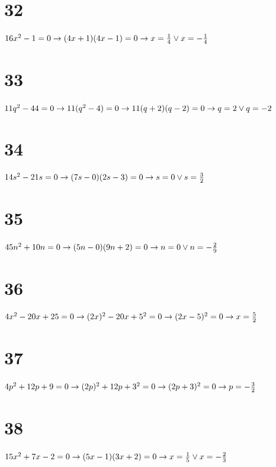 \documentclass{article}
\theoremstyle{definition}
\begin{document}
\section*{32}
$16x^2-1=0\newline\rightarrow (4x+1)(4x-1)=0\newline\rightarrow x=\frac{1}{4}\vee x=-\frac{1}{4}$

\section*{33}
$11q^2-44=0\newline\rightarrow 11(q^2-4)=0\newline\rightarrow 11(q+2)(q-2)=0\newline\rightarrow q=2\vee q=-2$

\section*{34}
$14s^2-21s=0\newline\rightarrow (7s-0)(2s-3)=0\newline\rightarrow s=0\vee s=\frac{3}{2}$

\section*{35}
$45n^2+10n=0\newline\rightarrow (5n-0)(9n+2)=0\newline\rightarrow n=0\vee n=-\frac{2}{9}$

\section*{36}
$4x^2-20x+25=0\newline\rightarrow (2x)^2-20x+5^2=0\newline\rightarrow (2x-5)^2=0\newline\rightarrow x=\frac{5}{2}$

\section*{37}
$4p^2+12p+9=0\newline\rightarrow (2p)^2+12p+3^2=0\newline\rightarrow (2p+3)^2=0\newline\rightarrow p=-\frac{3}{2}$

\section*{38}
$15x^2+7x-2=0\newline\rightarrow (5x-1)(3x+2)=0\newline\rightarrow x=\frac{1}{5}\vee x=-\frac{2}{3}$
\end{document}
